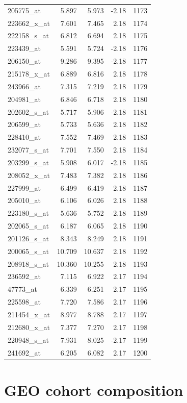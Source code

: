 \begin{footnotesize}
\begin{longtable}{lrrrr}
205775\_at & 5.897 & 5.973 & -2.18 & 1173 \\
223662\_x\_at & 7.601 & 7.465 & 2.18 & 1174 \\
222158\_s\_at & 6.812 & 6.694 & 2.18 & 1175 \\
223439\_at & 5.591 & 5.724 & -2.18 & 1176 \\
206150\_at & 9.286 & 9.395 & -2.18 & 1177 \\
215178\_x\_at & 6.889 & 6.816 & 2.18 & 1178 \\
243966\_at & 7.315 & 7.219 & 2.18 & 1179 \\
204981\_at & 6.846 & 6.718 & 2.18 & 1180 \\
202602\_s\_at & 5.717 & 5.906 & -2.18 & 1181 \\
206599\_at & 5.733 & 5.636 & 2.18 & 1182 \\
228410\_at & 7.552 & 7.469 & 2.18 & 1183 \\
232077\_s\_at & 7.701 & 7.550 & 2.18 & 1184 \\
203299\_s\_at & 5.908 & 6.017 & -2.18 & 1185 \\
208052\_x\_at & 7.483 & 7.382 & 2.18 & 1186 \\
227999\_at & 6.499 & 6.419 & 2.18 & 1187 \\
205010\_at & 6.106 & 6.026 & 2.18 & 1188 \\
223180\_s\_at & 5.636 & 5.752 & -2.18 & 1189 \\
202065\_s\_at & 6.187 & 6.065 & 2.18 & 1190 \\
201126\_s\_at & 8.343 & 8.249 & 2.18 & 1191 \\
200065\_s\_at & 10.709 & 10.637 & 2.18 & 1192 \\
208918\_s\_at & 10.360 & 10.255 & 2.18 & 1193 \\
236592\_at & 7.115 & 6.922 & 2.17 & 1194 \\
47773\_at & 6.339 & 6.251 & 2.17 & 1195 \\
225598\_at & 7.720 & 7.586 & 2.17 & 1196 \\
211454\_x\_at & 8.977 & 8.788 & 2.17 & 1197 \\
212680\_x\_at & 7.377 & 7.270 & 2.17 & 1198 \\
220948\_s\_at & 7.931 & 8.025 & -2.17 & 1199 \\
241692\_at & 6.205 & 6.082 & 2.17 & 1200 \\
\end{longtable}\end{footnotesize}
\section{GEO cohort composition}
